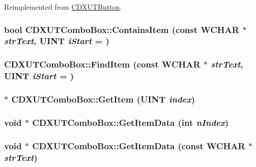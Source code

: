 Reimplemented from \hyperlink{class_c_d_x_u_t_button_a81d210561344736cca99976a8c8e6d57}{CDXUTButton}.\hypertarget{class_c_d_x_u_t_combo_box_a1f2a004f544f4ce18603688572594967}{
\subsubsection[{ContainsItem}]{\setlength{\rightskip}{0pt plus 5cm}bool CDXUTComboBox::ContainsItem (const WCHAR $\ast$ {\em strText}, \/  UINT {\em iStart} = {})}}
\label{class_c_d_x_u_t_combo_box_a1f2a004f544f4ce18603688572594967}
\hypertarget{class_c_d_x_u_t_combo_box_acb2d98d5fa0b8f9984f253dffaea2318}{
\subsubsection[{FindItem}]{ CDXUTComboBox::FindItem (const WCHAR $\ast$ {\em strText}, \/  UINT {\em iStart} = {})}}
\label{class_c_d_x_u_t_combo_box_acb2d98d5fa0b8f9984f253dffaea2318}
\hypertarget{class_c_d_x_u_t_combo_box_a2235c56b715f74aea5aa175cf0a8caa8}{
\subsubsection[{GetItem}]{$\ast$ CDXUTComboBox::GetItem (UINT {\em index})}}
\label{class_c_d_x_u_t_combo_box_a2235c56b715f74aea5aa175cf0a8caa8}
\hypertarget{class_c_d_x_u_t_combo_box_a93938cc0dcad77883818800ff4c68e5e}{
\subsubsection[{GetItemData}]{\setlength{\rightskip}{0pt plus 5cm}void $\ast$ CDXUTComboBox::GetItemData ({\bf int} {\em nIndex})}}
\label{class_c_d_x_u_t_combo_box_a93938cc0dcad77883818800ff4c68e5e}
\hypertarget{class_c_d_x_u_t_combo_box_a25cd3ea3c6094505c29ca6bf2c90d4af}{
\subsubsection[{GetItemData}]{\setlength{\rightskip}{0pt plus 5cm}void $\ast$ CDXUTComboBox::GetItemData (const WCHAR $\ast$ {\em strText})}}
